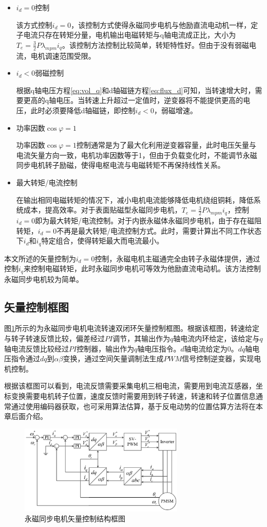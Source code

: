 \begin{itemize}
	\item $i_{d}=0$控制
	
该方式控制$i_{d}=0$，该控制方式使得永磁同步电机与他励直流电动机一样，定子电流只存在转矩分量，电机输出电磁转矩与q轴电流成正比，大小为$T_{e}=\frac{3}{2}P\lambda_{mpm}i_{q}$。该控制方法控制比较简单，转矩特性好。但由于没有弱磁电流，电机调速范围受限。
	\item $i_{d}<0$弱磁控制
	
根据q轴电压方程\ref{eq:vol_q}和d轴磁链方程\ref{eq:flux_d}可知，当转速增大时，需要更高的q轴电压。当转速上升超过一定值时，逆变器将不能提供更高的电压，此时必须要降低d轴磁链，即控制$i_{d}<0$，弱磁增速。
	\item 功率因数$\cos{\varphi}=1$
	
功率因数$\cos{\varphi}=1$控制通常是为了最大化利用逆变器容量，此时电压矢量与电流矢量方向一致，电机功率因数等于1，但由于负载变化时，不能调节永磁同步电机转子励磁，使得电枢电流与电磁转矩不再保持线性关系。
	\item 最大转矩/电流控制
	
在输出相同电磁转矩的情况下，减小电机电流能够降低电机绕组铜耗，降低系统成本，提高效率。对于表面贴磁型永磁同步电机，$T_{e}=\frac{3}{2}P\lambda_{mpm}i_{q}$，控制$i_{d}=0$即为最大转矩/电流控制。对于内嵌永磁体永磁同步电机，由于存在磁阻转矩，$i_{d}=0$不再是最大转矩/电流控制方式。此时，需要计算出不同工作状态下$i_{d}$和$i_{q}$特定组合，使得转矩最大而电流最小。	
\end{itemize}

本文所述的矢量控制为$i_{d}=0$控制，永磁电机主磁通完全由转子永磁体提供，通过控制$i_{q}$来控制电磁转矩，此时永磁同步电机可等效为他励直流电动机。该方法控制永磁同步电机较为简单。
\subsection{矢量控制框图}
图\ref{fig:focStructure}所示的为永磁同步电机电流转速双闭环矢量控制框图。根据该框图，转速给定与转子转速反馈比较，偏差经过$PI$调节，其输出作为$q$轴电流内环给定，该给定与$q$轴电流反馈比较经过$PI$控制器，输出作为$q$轴电压指令。$d$轴电流给定为0。$dq$轴电压指令通过$dq$到$\alpha\beta$变换，通过空间矢量调制法生成$PWM$信号控制逆变器，实现电机控制。

根据该框图可以看到，电流反馈需要采集电机三相电流，需要用到电流互感器，坐标变换需要电机转子位置，速度反馈时需要用到转子转速，转速和转子位置信息通常通过使用编码器获取，也可采用算法估算，基于反电动势的位置估算方法将在本章后面介绍。
\begin{figure}[H]
	\centering
	\includegraphics[width=0.7\textwidth]{figs/focStructure.eps}
	\caption{永磁同步电机矢量控制结构框图}
	\label{fig:focStructure}
\end{figure}

